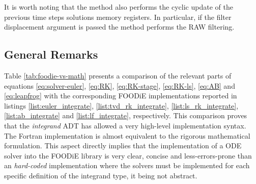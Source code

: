 \documentclass[pdftex,preprint,3p,times,numbers]{elsarticle}
\begin{document}
It is worth noting that the method also performs the cyclic update of the previous time steps solutions memory registers. In particular, if the filter displacement argument is passed the method performs the RAW filtering.

\subsection{General Remarks}\label{subsec:API-remarks}

Table \ref{tab:foodie-vs-math} presents a comparison of the relevant parts of equations \ref{eq:solver-euler}, \ref{eq:RK}, \ref{eq:RK-stage}, \ref{eq:RK-ls}, \ref{eq:AB} and \ref{eq:leapfrog} with the corresponding FOODiE implementations reported in listings \ref{list:euler_integrate}, \ref{list:tvd_rk_integrate}, \ref{list:ls_rk_integrate}, \ref{list:ab_integrate} and \ref{list:lf_integrate}, respectively. This comparison proves that the \emph{integrand} ADT has allowed a very high-level implementation syntax. The Fortran implementation is almost equivalent to the rigorous mathematical formulation. This aspect directly implies that the implementation of a ODE solver into the FOODiE library is very clear, concise and less-errors-prone than an \emph{hard-coded} implementation where the solvers must be implemented for each specific definition of the integrand type, it being not abstract.
\end{document}
